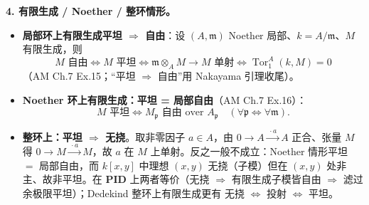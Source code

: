 \documentclass[a4paper]{ctexart}
\theoremstyle{definition}
\theoremstyle{analysis}
\theoremstyle{plain}
\begin{document}
\medskip

\textbf{4. 有限生成 / Noether / 整环情形。}
\begin{itemize}
  \item \textbf{局部环上有限生成平坦 \(\Rightarrow\) 自由}：设 \((A,\mathfrak m)\) Noether 局部、\(k=A/\mathfrak m\)、\(M\) 有限生成，则
  \[
    M\text{ 自由}
    \iff M\text{ 平坦}
    \iff \mathfrak m\otimes_A M\to M\text{ 单射}
    \iff \operatorname{Tor}_1^A(k,M)=0
  \]
  （AM Ch.7 Ex.15；``平坦 \(\Rightarrow\) 自由''用 Nakayama 引理收尾）。
  \item \textbf{Noether 环上有限生成：平坦 = 局部自由}（AM Ch.7 Ex.16）：
  \[
    M\text{ 平坦}\iff M_{\mathfrak p}\text{ 自由 over }A_{\mathfrak p}\quad(\forall\mathfrak p\iff\forall\mathfrak m).
  \]
  \item \textbf{整环上：平坦 \(\Rightarrow\) 无挠}。取非零因子 \(a\in A\)，由 \(0\to A\xrightarrow{\ \cdot a\ }A\) 正合、张量 \(M\) 得 \(0\to M\xrightarrow{\ \cdot a\ }M\)，故 \(a\) 在 \(M\) 上单射。反之一般不成立：Noether 情形平坦 \(=\) 局部自由，而 \(k[x,y]\) 中理想 \((x,y)\) 无挠（子模）但在 \((x,y)\) 处非主、故非平坦。在 \textbf{PID} 上两者等价（无挠 \(\Rightarrow\) 有限生成子模皆自由 \(\Rightarrow\) 滤过余极限平坦）；Dedekind 整环上有限生成更有 无挠 \(\iff\) 投射 \(\iff\) 平坦。
\end{itemize}

\medskip
\end{document}

